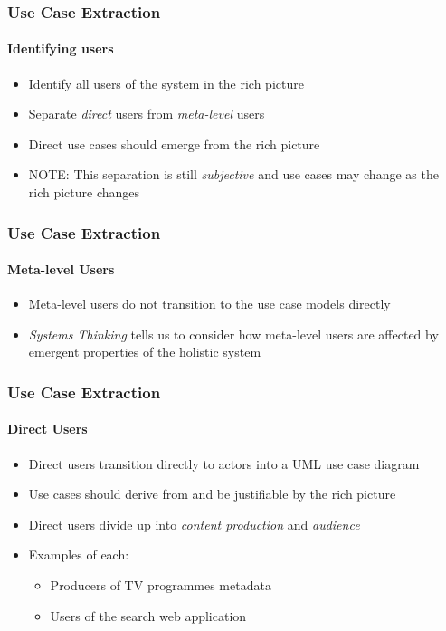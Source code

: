 \documentclass{beamer}
\begin{document}
\begin{frame}
  \frametitle{Use Case Extraction}
  \framesubtitle{Identifying users}
  \begin{itemize}
    \pause \item Identify all users of the system in the rich picture
    \pause \item Separate \emph{direct} users from \emph{meta-level} users
    \pause \item Direct use cases should emerge from the rich picture
    \pause \item NOTE: This separation is still \emph{subjective} and use cases may change as the rich picture changes
  \end{itemize}
\end{frame}

\begin{frame}
  \frametitle{Use Case Extraction}
  \framesubtitle{Meta-level Users}
  \begin{itemize}
    \pause \item Meta-level users do not transition to the use case models directly
    \pause \item \emph{Systems Thinking} tells us to consider how meta-level users are affected by emergent properties of the holistic system
  \end{itemize}
\end{frame}

\begin{frame}
  \frametitle{Use Case Extraction}
  \framesubtitle{Direct Users}
  \begin{itemize}
    \pause \item Direct users transition directly to actors into a UML use case diagram
    \pause \item Use cases should derive from and be justifiable by the rich picture
    \pause \item Direct users divide up into \emph{content production} and \emph{audience}
    \pause \item Examples of each:
    \begin{itemize}
      \pause \item Producers of TV programmes metadata
      \pause \item Users of the search web application
    \end{itemize}
  \end{itemize}
\end{frame}
\end{document}
